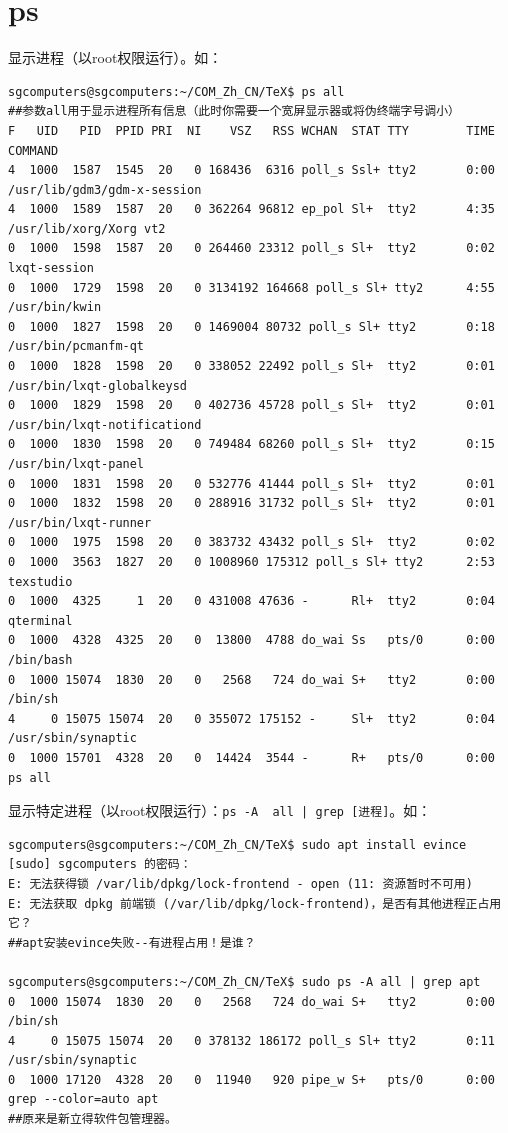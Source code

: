 \section{ps}
显示进程（以root权限运行）。如：
\begin{verbatim}
sgcomputers@sgcomputers:~/COM_Zh_CN/TeX$ ps all
##参数all用于显示进程所有信息（此时你需要一个宽屏显示器或将伪终端字号调小）
F   UID   PID  PPID PRI  NI    VSZ   RSS WCHAN  STAT TTY        TIME COMMAND
4  1000  1587  1545  20   0 168436  6316 poll_s Ssl+ tty2       0:00 /usr/lib/gdm3/gdm-x-session 
4  1000  1589  1587  20   0 362264 96812 ep_pol Sl+  tty2       4:35 /usr/lib/xorg/Xorg vt2 
0  1000  1598  1587  20   0 264460 23312 poll_s Sl+  tty2       0:02 lxqt-session
0  1000  1729  1598  20   0 3134192 164668 poll_s Sl+ tty2      4:55 /usr/bin/kwin
0  1000  1827  1598  20   0 1469004 80732 poll_s Sl+ tty2       0:18 /usr/bin/pcmanfm-qt 
0  1000  1828  1598  20   0 338052 22492 poll_s Sl+  tty2       0:01 /usr/bin/lxqt-globalkeysd
0  1000  1829  1598  20   0 402736 45728 poll_s Sl+  tty2       0:01 /usr/bin/lxqt-notificationd
0  1000  1830  1598  20   0 749484 68260 poll_s Sl+  tty2       0:15 /usr/bin/lxqt-panel
0  1000  1831  1598  20   0 532776 41444 poll_s Sl+  tty2       0:01 
0  1000  1832  1598  20   0 288916 31732 poll_s Sl+  tty2       0:01 /usr/bin/lxqt-runner
0  1000  1975  1598  20   0 383732 43432 poll_s Sl+  tty2       0:02 
0  1000  3563  1827  20   0 1008960 175312 poll_s Sl+ tty2      2:53 texstudio
0  1000  4325     1  20   0 431008 47636 -      Rl+  tty2       0:04 qterminal
0  1000  4328  4325  20   0  13800  4788 do_wai Ss   pts/0      0:00 /bin/bash
0  1000 15074  1830  20   0   2568   724 do_wai S+   tty2       0:00 /bin/sh 
4     0 15075 15074  20   0 355072 175152 -     Sl+  tty2       0:04 /usr/sbin/synaptic
0  1000 15701  4328  20   0  14424  3544 -      R+   pts/0      0:00 ps all
\end{verbatim} \par
显示特定进程（以root权限运行）：\verb/ps -A  all | grep [进程]/。如：
\begin{verbatim}
sgcomputers@sgcomputers:~/COM_Zh_CN/TeX$ sudo apt install evince
[sudo] sgcomputers 的密码： 
E: 无法获得锁 /var/lib/dpkg/lock-frontend - open (11: 资源暂时不可用)
E: 无法获取 dpkg 前端锁 (/var/lib/dpkg/lock-frontend)，是否有其他进程正占用它？
##apt安装evince失败--有进程占用！是谁？

sgcomputers@sgcomputers:~/COM_Zh_CN/TeX$ sudo ps -A all | grep apt
0  1000 15074  1830  20   0   2568   724 do_wai S+   tty2       0:00 /bin/sh 
4     0 15075 15074  20   0 378132 186172 poll_s Sl+ tty2       0:11 /usr/sbin/synaptic
0  1000 17120  4328  20   0  11940   920 pipe_w S+   pts/0      0:00 grep --color=auto apt
##原来是新立得软件包管理器。
\end{verbatim}
